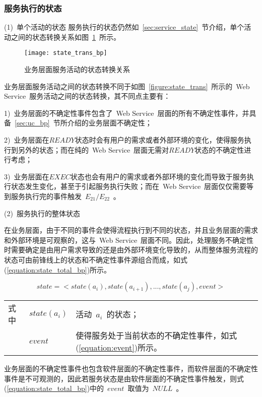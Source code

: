 \subsubsection{服务执行的状态}

(1)~单个活动的状态
服务执行的状态仍然如~\ref{sec:service_state}~节介绍，单个活动之间的状态转换关系如图~\ref{figure:state_trans_pb}~所示。

\begin{figure}[htbp]
    \centering
    \texttt{[image: state\_trans\_bp]}
    \caption{业务层面服务活动的状态转换关系}\label{figure:state_trans_pb}
    \vspace{-1em}
\end{figure}

业务层面服务活动之间的状态转换不同于如图~\ref{figure:state_trans}~所示的~Web Service~服务活动之间的状态转换，其不同点主要有：

1)~业务层面的不确定性事件包含了~Web Service~层面的所有不确定性事件，并具备~\ref{sec:uc_bp}~节所介绍的业务层面不确定性；

2)~业务层面在$READY$状态时会有用户的需求或者外部环境的变化，使得服务执行到另外的状态；而在纯的~Web Service~层面无需对$READY$状态的不确定性进行考虑；

3)~业务层面在$EXEC$状态也会有用户的需求或者外部环境的变化而导致于服务执行状态发生变化，甚至于引起服务执行失败；而在~Web Service~层面仅仅需要等到服务执行完的事件触发~$E_{21}/E_{22}$~。

(2)~服务执行的整体状态

在业务层面，由于不同的事件会使得流程执行到不同的状态，并且业务层面的需求和外部环境是可观察的，这与~Web Service~层面不同。因此，处理服务不确定性时需要确定是由用户需求导致的还是由外部环境变化导致的，从而整体服务流程的状态可由前锋线上的状态和不确定性事件源组合而成，如式(\ref{equation:state_total_bp})所示。

\begin{equation}\label{equation:state_total_bp}
state = < state(a_i),state(a_{i+1}),..., state(a_j), event >
\end{equation}
\begin{tabularx}{\textwidth}{@{}l@{\quad}l@{\pozhehao }X@{}}
    式中
    & $state(a_i)$ & 活动~$a_i$~的状态；\\
    & $event$ & 使得服务处于当前状态的不确定性事件，如式(\ref{equation:event})所示。
\end{tabularx}\vspace{\wordsep}

业务层面的不确定性事件也包含软件层面的不确定性事件，而软件层面的不确定性事件是不可观测的，因此若服务状态是由软件层面的不确定性事件触发，则式(\ref{equation:state_total_bp})中的~$event$~取值为~$NULL$~。

